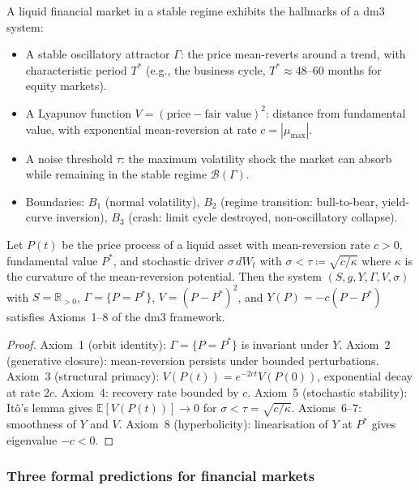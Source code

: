 A liquid financial market in a stable regime exhibits the
hallmarks of a dm3 system:
\begin{itemize}
  \item A stable oscillatory attractor $\Gamma$: the price
    mean-reverts around a trend, with characteristic period
    $T^*$ (e.g., the business cycle, $T^* \approx 48$--$60$
    months for equity markets).
  \item A Lyapunov function $V = (\text{price} - \text{fair value})^2$:
    distance from fundamental value, with exponential mean-reversion
    at rate $c = |\mu_{\max}|$.
  \item A noise threshold $\tau$: the maximum volatility shock
    the market can absorb while remaining in the stable regime
    $\mathcal{B}(\Gamma)$.
  \item Boundaries: $B_1$ (normal volatility), $B_2$ (regime
    transition: bull-to-bear, yield-curve inversion), $B_3$
    (crash: limit cycle destroyed, non-oscillatory collapse).
\end{itemize}

\begin{proposition}
\label{prop:market}
Let $P(t)$ be the price process of a liquid asset with
mean-reversion rate $c > 0$, fundamental value $P^*$,
and stochastic driver $\sigma\,dW_t$ with $\sigma < \tau
\coloneqq \sqrt{c/\kappa}$ where $\kappa$ is the curvature
of the mean-reversion potential. Then the system
$(S, g, Y, \Gamma, V, \sigma)$ with $S = \mathbb{R}_{>0}$,
$\Gamma = \{P = P^*\}$, $V = (P - P^*)^2$, and
$Y(P) = -c(P - P^*)$ satisfies Axioms~1--8 of the dm3 framework.
\end{proposition}

\begin{proof}
Axiom~1 (orbit identity): $\Gamma = \{P = P^*\}$ is invariant
under $Y$. Axiom~2 (generative closure): mean-reversion persists
under bounded perturbations. Axiom~3 (structural primacy):
$V(P(t)) = e^{-2ct}V(P(0))$, exponential decay at rate $2c$.
Axiom~4: recovery rate bounded by $c$. Axiom~5 (stochastic
stability): It\^{o}'s lemma gives $\mathbb{E}[V(P(t))] \to 0$
for $\sigma < \tau = \sqrt{c/\kappa}$. Axioms~6--7: smoothness
of $Y$ and $V$. Axiom~8 (hyperbolicity): linearisation of $Y$
at $P^*$ gives eigenvalue $-c < 0$.
\end{proof}

\subsubsection{Three formal predictions for financial markets}

